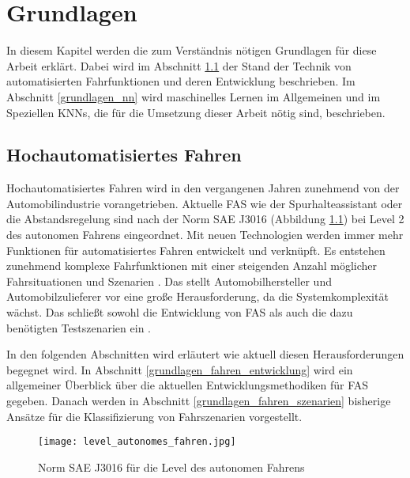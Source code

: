 
\chapter{Grundlagen}
\label{grundlagen}

In diesem Kapitel werden die zum Verständnis nötigen Grundlagen für diese Arbeit erklärt. Dabei wird im Abschnitt \ref{grundlagen_fahren} der Stand der Technik von automatisierten Fahrfunktionen und deren Entwicklung beschrieben. Im Abschnitt \ref{grundlagen_nn} wird maschinelles Lernen im Allgemeinen und im Speziellen \acp{KNN}, die für die Umsetzung dieser Arbeit nötig sind, beschrieben.


\section{Hochautomatisiertes Fahren}
\label{grundlagen_fahren}

Hochautomatisiertes Fahren wird in den vergangenen Jahren zunehmend von der Automobilindustrie vorangetrieben. Aktuelle \ac{FAS} wie der Spurhalteassistant oder die Abstandsregelung sind nach der Norm SAE J3016 (Abbildung \ref{fig_level_autonomes_fahren}) bei Level 2 des autonomen Fahrens eingeordnet. Mit neuen Technologien werden immer mehr Funktionen für automatisiertes Fahren entwickelt und verknüpft. Es entstehen zunehmend komplexe Fahrfunktionen mit einer steigenden Anzahl möglicher Fahrsituationen und Szenarien \cite{king2017identification}. Das stellt Automobilhersteller und Automobilzulieferer vor eine große Herausforderung, da die Systemkomplexität wächst. Das schließt sowohl die Entwicklung von \ac{FAS} als auch die dazu benötigten Testszenarien ein \cite{pfeffer2016continuous}.

In den folgenden Abschnitten wird erläutert wie aktuell diesen Herausforderungen begegnet wird. In Abschnitt \ref{grundlagen_fahren_entwicklung} wird ein allgemeiner Überblick über die aktuellen Entwicklungsmethodiken für \ac{FAS} gegeben. Danach werden in Abschnitt \ref{grundlagen_fahren_szenarien} bisherige Ansätze für die Klassifizierung von Fahrszenarien vorgestellt.

\begin{figure}[h]
\centering
\texttt{[image: level\_autonomes\_fahren.jpg]}
\caption{Norm SAE J3016 für die Level des autonomen Fahrens \cite{sae2014taxonomy}}
\label{fig_level_autonomes_fahren}
\end{figure}


